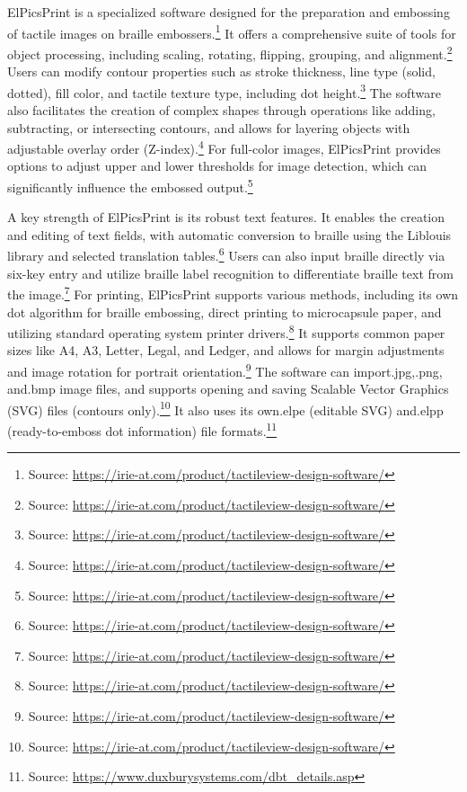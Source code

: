 ElPicsPrint is a specialized software designed for the preparation and embossing of tactile images on braille embossers.\footnote{Source:  \url{https://irie-at.com/product/tactileview-design-software/}} It offers a comprehensive suite of tools for object processing, including scaling, rotating, flipping, grouping, and alignment.\footnote{Source:  \url{https://irie-at.com/product/tactileview-design-software/}} Users can modify contour properties such as stroke thickness, line type (solid, dotted), fill color, and tactile texture type, including dot height.\footnote{Source:  \url{https://irie-at.com/product/tactileview-design-software/}} The software also facilitates the creation of complex shapes through operations like adding, subtracting, or intersecting contours, and allows for layering objects with adjustable overlay order (Z-index).\footnote{Source:  \url{https://irie-at.com/product/tactileview-design-software/}} For full-color images, ElPicsPrint provides options to adjust upper and lower thresholds for image detection, which can significantly influence the embossed output.\footnote{Source:  \url{https://irie-at.com/product/tactileview-design-software/}}

A key strength of ElPicsPrint is its robust text features. It enables the creation and editing of text fields, with automatic conversion to braille using the Liblouis library and selected translation tables.\footnote{Source:  \url{https://irie-at.com/product/tactileview-design-software/}} Users can also input braille directly via six-key entry and utilize braille label recognition to differentiate braille text from the image.\footnote{Source:  \url{https://irie-at.com/product/tactileview-design-software/}} For printing, ElPicsPrint supports various methods, including its own dot algorithm for braille embossing, direct printing to microcapsule paper, and utilizing standard operating system printer drivers.\footnote{Source:  \url{https://irie-at.com/product/tactileview-design-software/}} It supports common paper sizes like A4, A3, Letter, Legal, and Ledger, and allows for margin adjustments and image rotation for portrait orientation.\footnote{Source:  \url{https://irie-at.com/product/tactileview-design-software/}} The software can import.jpg,.png, and.bmp image files, and supports opening and saving Scalable Vector Graphics (SVG) files (contours only).\footnote{Source:  \url{https://irie-at.com/product/tactileview-design-software/}} It also uses its own.elpe (editable SVG) and.elpp (ready-to-emboss dot information) file formats.\footnote{Source:  \url{https://www.duxburysystems.com/dbt_details.asp}}

